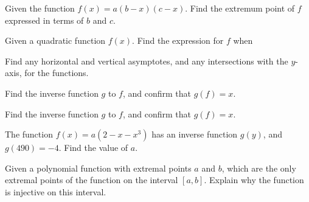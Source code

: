 




\opgt

\nes
{}
Given the function 
$ f(x)=a(b-x)(c-x) $. Find the extremum point of $ f $ expressed in terms of $ b $ and $ c $. 

Given a quadratic function $ f(x) $. Find the expression for $ f $ when
 \vs

\nes
{}
Find any horizontal and vertical asymptotes, and any intersections with the $ y $-axis, for the functions. \os
{} \os
{}

\nes
{}
Find the inverse function $ g $ to $ f $, and confirm that $ g(f)=x $. \os
{} \os
{}

Find the inverse function $ g $ to $ f $, and confirm that $ g(f)=x $. \os
{}

The function $ f(x)=a(2-x-x^3) $ has an inverse function $ g(y) $, and $ g(490)= -4$. Find the value of $ a $.

\nes
{}
Given a polynomial function with extremal points $ a $ and $ b $, which are the only extremal points of the function on the interval $ [a, b] $. Explain why the function is injective on this interval.

